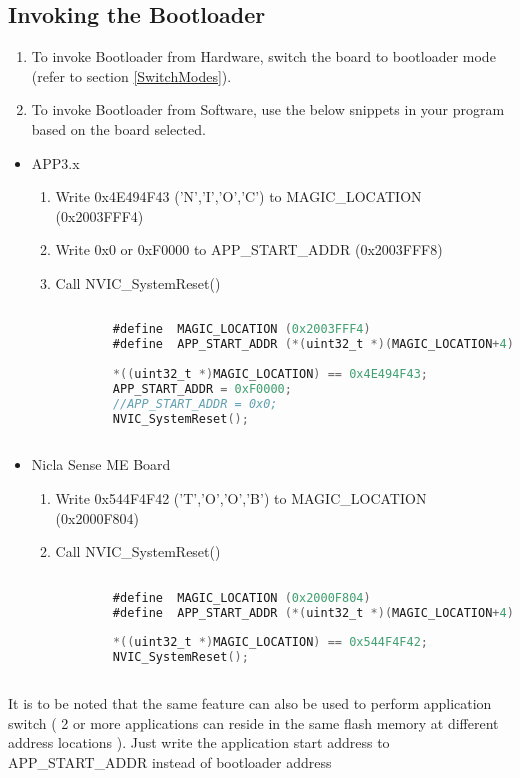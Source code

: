 \documentclass{article}
\begin{document}
\subsection{Invoking the Bootloader}
\begin{enumerate}
	\item To invoke Bootloader from Hardware, switch the board to bootloader mode (refer to section \ref{SwitchModes}).
	\item To invoke Bootloader from Software, use the below snippets in your program based on the board selected.
\end{enumerate}

\begin{itemize}
	\item APP3.x
	\begin{enumerate}[label=\roman*.]
		\item Write 0x4E494F43 ('N','I','O','C') to MAGIC\_LOCATION (0x2003FFF4)
		\item Write 0x0 or 0xF0000 to APP\_START\_ADDR (0x2003FFF8)
		\item Call NVIC\_SystemReset()
		\begin{lstlisting}[language=C]
		
		#define  MAGIC_LOCATION (0x2003FFF4)
		#define  APP_START_ADDR (*(uint32_t *)(MAGIC_LOCATION+4)
		 
		*((uint32_t *)MAGIC_LOCATION) == 0x4E494F43;
		APP_START_ADDR = 0xF0000;
		//APP_START_ADDR = 0x0;
		NVIC_SystemReset();
		
		\end{lstlisting}
	\end{enumerate}
\end{itemize}

\begin{itemize}
	\item Nicla Sense ME Board
	\begin{enumerate}[label=\roman*.]
		\item Write 0x544F4F42 ('T','O','O','B') to MAGIC\_LOCATION (0x2000F804)
		\item Call NVIC\_SystemReset()
		\begin{lstlisting}[language=C]
		
		#define  MAGIC_LOCATION (0x2000F804)
		#define  APP_START_ADDR (*(uint32_t *)(MAGIC_LOCATION+4)
		 
		*((uint32_t *)MAGIC_LOCATION) == 0x544F4F42;
		NVIC_SystemReset();
		
		\end{lstlisting}
	\end{enumerate}
\end{itemize}
It is to be noted that the same feature can also be used to perform application switch ( 2 or more applications can reside in the same flash memory at different address locations ). Just write the application start address to APP\_START\_ADDR instead of bootloader address
\end{document}
